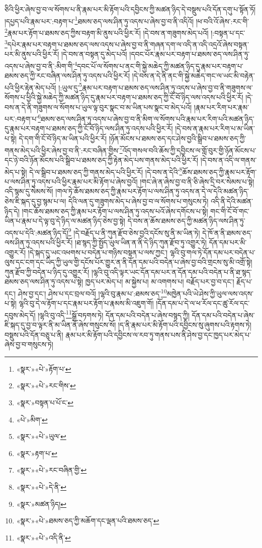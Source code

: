 ཅིའི་ཕྱིར་ཞེས་བྱ་བ་ལ་སོགས་པ་ནི་རྣམ་པར་མི་རྟོག་པའི་དབྱིངས་ཀྱི་མཚན་ཉིད་དེ་བསྡུས་པའི་དོན་དགུ་པ་སྟོན་ཏོ། །དཔྱད་པའི་རྣམ་པར་:བརྟག་པ་\footnote{«སྣར་»«པེ་»རྟོག་པ་}ཐམས་ཅད་ལས་ཤིན་ཏུ་འདས་པ་ཞེས་བྱ་བ་ནི་འདིའོ། །ཕ་བའི་འོ་ཞེས་:རང་གི་\footnote{«སྣར་»«པེ་»རང་གིས་}རྣམ་པར་རྟོག་པ་ཐམས་ཅད་ཀྱིས་བརྟག་མི་ནུས་པའི་ཕྱིར་རོ། །དེ་བས་ན་གཟུགས་མེད་པའོ། །:བསྟན་པ་དང་\footnote{«སྣར་»བསྟན་པ་པོ་ང་}དཔེར་རྣམ་པར་བརྟག་པ་ཐམས་ཅད་ལས་འདས་པ་ཞེས་བྱ་བ་ནི་གཞན་དག་ལ་འདི་ན་འདི་འདྲའོ་ཞེས་བསྟན་པར་མི་ནུས་པའི་ཕྱིར་རོ། །དེ་བས་ན་བསྟན་དུ་མེད་པའོ། །དབང་པོར་རྣམ་པར་བརྟག་པ་ཐམས་ཅད་ལས་ཤིན་ཏུ་འདས་པ་ཞེས་བྱ་བ་ནི་:མིག་གི་\footnote{«པེ་»མིག་}དབང་པོ་ལ་སོགས་པ་ནང་གི་སྐྱེ་མཆེད་ཀྱི་མཚན་ཉིད་དུ་རྣམ་པར་བརྟག་པ་ཐམས་ཅད་ཀྱི་རང་བཞིན་ལས་ཤིན་ཏུ་འདས་པའི་ཕྱིར་རོ། །དེ་བས་ན་དེ་ནི་ནང་གི་སྐྱེ་མཆེད་གང་ལ་ཡང་མི་བརྟེན་པའི་ཕྱིར་རྟེན་མེད་པའོ། །:ཡུལ་དུ་\footnote{«སྣར་»«པེ་»ཡུལ་}རྣམ་པར་བརྟག་པ་ཐམས་ཅད་ལས་ཤིན་ཏུ་འདས་པ་ཞེས་བྱ་བ་ནི་གཟུགས་ལ་སོགས་པ་ཕྱིའི་སྐྱེ་མཆེད་ཀྱི་མཚན་ཉིད་དུ་རྣམ་པར་བརྟག་པ་ཐམས་ཅད་ཀྱི་ངོ་བོ་ཉིད་ལས་འདས་པའི་ཕྱིར་རོ། །དེ་བས་ན་དེ་ནི་གཟུགས་ལ་སོགས་པ་ཡུལ་ལྟ་བུར་སྣང་བ་མ་ཡིན་པས་སྣང་བ་མེད་པའོ། །རྣམ་པར་རིག་པར་རྣམ་པར་:བརྟག་པ་\footnote{«སྣར་»རྟག་པ་}ཐམས་ཅད་ལས་ཤིན་ཏུ་འདས་པ་ཞེས་བྱ་བ་ནི་མིག་ལ་སོགས་པའི་རྣམ་པར་རིག་པའི་མཚན་ཉིད་དུ་རྣམ་པར་བརྟག་པ་ཐམས་ཅད་ཀྱི་ངོ་བོ་ཉིད་ལས་ཤིན་ཏུ་འདས་པའི་ཕྱིར་རོ། །དེ་བས་ན་རྣམ་པར་རིག་པ་མ་ཡིན་པ་སྟེ། དེ་དག་གི་ངོ་བོ་ཉིད་མ་ཡིན་པའི་ཕྱིར་རོ། །ཉོན་མོངས་པ་ཐམས་ཅད་དང་ཤེས་བྱའི་སྒྲིབ་པ་ཐམས་ཅད་ཀྱི་གནས་མེད་པའི་ཕྱིར་ཞེས་བྱ་བ་ནི་:རང་བཞིན་གྱིས་\footnote{«སྣར་»«པེ་»རང་བཞིན་གྱི་}འོད་གསལ་བའི་ཆོས་ཀྱི་དབྱིངས་ལ་གློ་བུར་གྱི་ཉོན་མོངས་པ་དང་ཉེ་བའི་ཉོན་མོངས་པའི་སྒྲིབ་པ་ཐམས་ཅད་ཀྱི་རྟེན་མེད་པས་གནས་མེད་པའི་ཕྱིར་རོ། །དེ་བས་ན་འདི་ལ་གནས་མེད་པ་སྟེ། དེ་ལ་སྒྲིབ་པ་ཐམས་ཅད་ཀྱི་གནས་མེད་པའི་ཕྱིར་རོ། །དེ་བས་ན་དེའི་\footnote{«སྣར་»«པེ་»དེ་ནི་}ཆོས་ཐམས་ཅད་ཀྱི་རྣམ་པར་རྟོག་པ་ལས་ཤིན་ཏུ་འདས་པའི་ཕྱིར་རྣམ་པར་མི་རྟོག་པ་ཞེས་བྱའོ། །གང་ཞེ་ན་ཞེས་བྱ་བ་ནི་ཅི་ཞེས་དྲི་བར་སེམས་པ་སྟེ། འདི་སྙམ་དུ་སེམས་སོ། །གལ་ཏེ་ཆོས་ཐམས་ཅད་ཀྱི་རྣམ་པར་རྟོག་པ་ལས་ཤིན་ཏུ་འདས་ན་དེ་ལ་དེའི་མཚན་ཉིད་ཅེས་ཇི་སྐད་དུ་བྱ་སྙམ་པ་ལ། དེའི་ལན་དུ་གཟུགས་མེད་པ་ཞེས་བྱ་བ་ལ་སོགས་པ་གསུངས་ཏེ། འདི་ནི་དེའི་མཚན་ཉིད་དེ། །གང་ཆོས་ཐམས་ཅད་ཀྱི་རྣམ་པར་རྟོག་པ་ལས་ཤིན་ཏུ་འདས་པའོ་ཞེས་དགོངས་པ་སྟེ། གང་གི་ངོ་བོ་གང་ཡིན་པ་རྣམ་པ་དེ་ལྟ་བུ་དེ་ཉིད་ལ་མཚན་ཉིད་ཅེས་བྱ་སྟེ། དེ་བས་ན་ཆོས་ཐམས་ཅད་ཀྱི་མཚན་ཉིད་ལས་ཤིན་ཏུ་འདས་པ་དེའི་:མཚན་ཉིད་དོ།\footnote{«སྣར་»མཚན་ཉིད།} །དེ་བརྗོད་པ་ནི་ཀུན་རྫོབ་ཅེས་བྱའི་དངོས་སུ་ནི་མ་ཡིན་ཏེ། དེ་ཁོ་ན་ནི་ཐམས་ཅད་ལས་ཤིན་ཏུ་འདས་པའི་ཕྱིར་རོ། །ཐ་སྙད་ཀྱི་སྤྱོད་ཡུལ་ཡིན་ན་ནི་དེ་ཉིད་ཀུན་རྫོབ་ཏུ་འགྱུར་ཏེ། དོན་དམ་པར་མི་འགྱུར་རོ། །དེ་སྐད་དུ་ཡང་འཕགས་པ་བདེན་པ་གཉིས་བསྟན་པ་ལས་ཀྱང་། ལྷའི་བུ་གལ་ཏེ་དོན་དམ་པར་བདེན་པ་ལུས་དང་ངག་དང་ཡིད་ཀྱི་ཡུལ་གྱི་དངོས་པོར་གྱུར་ན་ནི་དོན་དམ་པའི་བདེན་པ་ཞེས་བྱ་བའི་གྲངས་སུ་མི་འགྲོ་སྟེ། ཀུན་རྫོབ་ཀྱི་བདེན་པ་ཉིད་དུ་འགྱུར་རོ། །ལྷའི་བུ་འདི་ལྟར་ཡང་དོན་དམ་པར་ན་དོན་དམ་པའི་བདེན་པ་ནི་ཐ་སྙད་ཐམས་ཅད་ལས་ཤིན་ཏུ་འདས་པ་སྟེ། ཁྱད་པར་མེད་པ། མ་སྐྱེས་པ། མ་འགགས་པ། བརྗོད་པར་བྱ་བ་དང་། རྗོད་པ་དང་། ཤེས་བྱ་དང་། ཤེས་པ་དང་བྲལ་བའོ། །ལྷའི་བུ་རྣམ་པ་:ཐམས་ཅད་\footnote{«སྣར་»«པེ་»ཐམས་ཅད་ཀྱི་མཆོག་དང་ལྡན་པའི་ཐམས་ཅད་}མཁྱེན་པའི་ཡེ་ཤེས་ཀྱི་ཡུལ་ལས་འདས་པ་སྟེ། ལྷའི་བུ་དེ་ལ་རྟོག་པ་དང་རྣམ་པར་རྟོག་པ་རྣམས་མི་འཇུག་གོ། །དོན་དམ་པ་དེ་ལ་ཕ་རོལ་དང་ཚུ་རོལ་དང་དབུས་མེད་དོ། །ལྷའི་བུ་འདི་\footnote{«སྣར་»«པེ་»འདི་ནི་}སྒྲོ་བཏགས་ཏེ། དོན་དམ་པའི་བདེན་པ་ཞེས་བསྙད་ཀྱི། དོན་དམ་པའི་བདེན་པ་ཞེས་ཇི་སྐད་དུ་བྱ་བ་ལྟར་ནི་མ་ཡིན་ནོ་ཞེས་གསུངས་སོ། །ད་ནི་རྣམ་པར་མི་རྟོག་པའི་དབྱིངས་སུ་ཞུགས་པའི་རྟགས་ཏེ། བསྡུས་པའི་དོན་བཅུ་པ་ནི། རྣམ་པར་མི་རྟོག་པའི་དབྱིངས་ལ་རབ་ཏུ་གནས་པས་ནི་ཤེས་བྱ་དང་ཁྱད་པར་མེད་པ་ཞེས་བྱ་བ་གསུངས་ཏེ། 